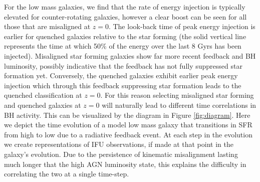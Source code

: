 For the low mass galaxies, we find that the rate of energy injection is typically elevated for counter-rotating galaxies, however a clear boost can be seen for all those that are misaligned at $z=0$. The look-back time of peak energy injection is earlier for quenched galaxies relative to the star forming (the solid vertical line represents the time at which 50\% of the energy over the last 8 Gyrs has been injected). Misaligned star forming galaxies show far more recent feedback and BH luminosity, possibly indicative that the feedback has not fully suppressed star formation yet. Conversely, the quenched galaxies exhibit earlier peak energy injection which through this feedback suppressing star formation leads to the quenched classification at $z=0$. For this reason selecting misaligned star forming and quenched galaxies at $z=0$ will naturally lead to different time correlations in BH activity. This can be visualized by the diagram in Figure \ref{fig:diagram}. Here we depict the time evolution of a model low mass galaxy that transitions in SFR from high to low due to a radiative feedback event. At each step in the evolution we create representations of IFU observations, if made at that point in the galaxy's evolution. Due to the persistence of kinematic misalignment lasting much longer that the high AGN luminosity state, this explains the difficulty in correlating the two at a single time-step. 

